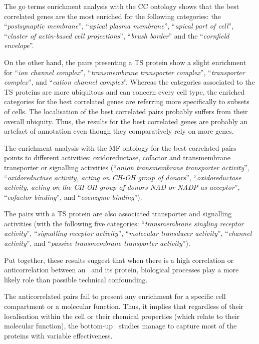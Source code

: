The \gls{go} terms enrichment analysis with the CC ontology shows
that the best correlated genes are the most enriched
for the following categories:
the \enquote{\textit{postsynaptic membrane}},
\enquote{\textit{apical plasma membrane}},
\enquote{\textit{apical part of cell}},
\enquote{\textit{cluster of actin-based cell projections}},
\enquote{\textit{brush border}}
and the \enquote{\textit{cornfield envelope}}.\mybr\

On the other hand, the pairs presenting a \gls{TS} protein
show a slight enrichment for
\enquote{\textit{ion channel complex}},
\enquote{\textit{transmembrane transporter complex}},
\enquote{\textit{transporter complex}},
and \enquote{\textit{cation channel complex}}.
Whereas the categories associated to the \gls{TS} proteins
are more ubiquitous and can concern every cell type,
the enriched categories for the best correlated genes
are referring more specifically to subsets of cells.
The localisation of the best correlated pairs probably suffers
from their overall ubiquity.
Thus, the results for the best correlated genes are probably an artefact
of annotation
even though they comparatively rely on more genes.\mybr\

The enrichment analysis with the MF ontology
for the best correlated pairs points to different activities:
oxidoreductase, cofactor and transmembrane transporter or signalling activities
(\enquote{\textit{anion transmembrane transporter activity}},
\enquote{\textit{oxidoreductase activity, acting on CH-OH group of donors}},
\enquote{\textit{oxidoreductase activity, acting on the CH-OH group of donors
NAD or NADP as acceptor}},
\enquote{\textit{cofactor binding}},
and \enquote{\textit{coenzyme binding}}).

The pairs with a \gls{TS} protein are also associated
transporter and signalling activities
(with the following five categories:
\enquote{\textit{transmembrane singling receptor activity}},
\enquote{\textit{signalling receptor activity}},
\enquote{\textit{molecular transducer activity}},
\enquote{\textit{channel activity}},
and \enquote{\textit{passive transmembrane transporter activity}}).

Put together, these results suggest that
when there is a high correlation or anticorrelation between an \mRNA\ and its protein,
biological processes play a more likely role than possible technical confounding.

The anticorrelated pairs fail to present any enrichment
for a specific cell compartment or a molecular function.
Thus, it implies that
regardless of their localisation within the cell
or their chemical properties (which relate to their molecular function),
the bottom-up \ms\ studies manage to capture most of the proteins
with variable effectiveness.

